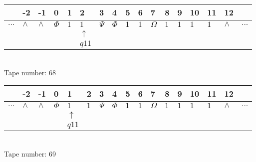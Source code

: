 \documentclass{article}
\begin{document}
\begin{table}[H]
\centering
\begin{tabular}{lllllllllllllllll}
 & -2 & -1 & 0 & 1 & 2 & 3 & 4 & 5 & 6 & 7 & 8 & 9 & 10 & 11 & 12 & \\
\hline
$...$ & \multicolumn{1}{|l|}{$\wedge$} & \multicolumn{1}{|l|}{$\wedge$} & \multicolumn{1}{|l|}{$\Phi$} & \multicolumn{1}{|l|}{$1$} & \multicolumn{1}{|l|}{$1$} & \multicolumn{1}{|l|}{$\Psi$} & \multicolumn{1}{|l|}{$\Phi$} & \multicolumn{1}{|l|}{$1$} & \multicolumn{1}{|l|}{$1$} & \multicolumn{1}{|l|}{$\Omega$} & \multicolumn{1}{|l|}{$1$} & \multicolumn{1}{|l|}{$1$} & \multicolumn{1}{|l|}{$1$} & \multicolumn{1}{|l|}{$1$} & \multicolumn{1}{|l|}{$\wedge$} & $...$\\
\hline
&  &  &  &  & $\uparrow$ &  &  &  &  &  &  &  &  &  &  &  \\
&  &  &  &  & $ q11 $ &  &  &  &  &  &  &  &  &  &  &  \\
\end{tabular}
\\
Tape number: 68
\noindent\makebox[\linewidth]{\hdashrule{\textwidth}{1pt}{1pt}}\end{table}

\begin{table}[H]
\centering
\begin{tabular}{lllllllllllllllll}
 & -2 & -1 & 0 & 1 & 2 & 3 & 4 & 5 & 6 & 7 & 8 & 9 & 10 & 11 & 12 & \\
\hline
$...$ & \multicolumn{1}{|l|}{$\wedge$} & \multicolumn{1}{|l|}{$\wedge$} & \multicolumn{1}{|l|}{$\Phi$} & \multicolumn{1}{|l|}{$1$} & \multicolumn{1}{|l|}{$1$} & \multicolumn{1}{|l|}{$\Psi$} & \multicolumn{1}{|l|}{$\Phi$} & \multicolumn{1}{|l|}{$1$} & \multicolumn{1}{|l|}{$1$} & \multicolumn{1}{|l|}{$\Omega$} & \multicolumn{1}{|l|}{$1$} & \multicolumn{1}{|l|}{$1$} & \multicolumn{1}{|l|}{$1$} & \multicolumn{1}{|l|}{$1$} & \multicolumn{1}{|l|}{$\wedge$} & $...$\\
\hline
&  &  &  & $\uparrow$ &  &  &  &  &  &  &  &  &  &  &  &  \\
&  &  &  & $ q11 $ &  &  &  &  &  &  &  &  &  &  &  &  \\
\end{tabular}
\\
Tape number: 69
\noindent\makebox[\linewidth]{\hdashrule{\textwidth}{1pt}{1pt}}\end{table}
\end{document}
